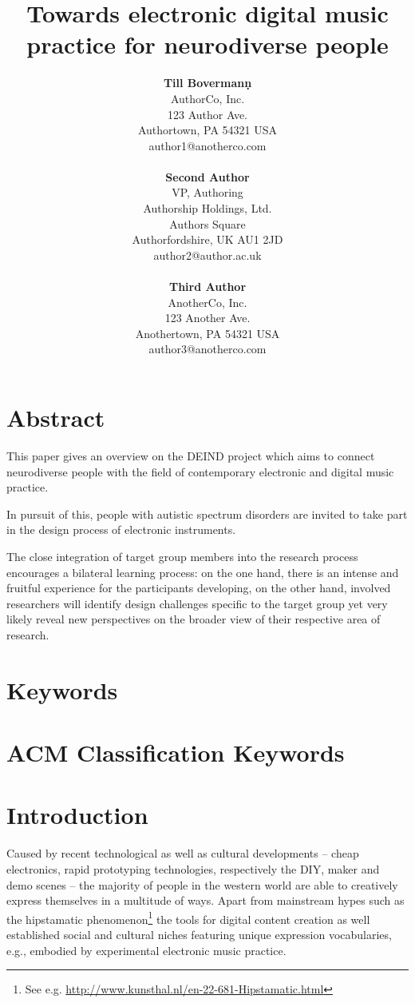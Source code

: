 \documentclass{chi-ext}
\title{Towards electronic digital music practice for neurodiverse people}
\author{
  \textbf{Till Bovermanṇ} \\
  AuthorCo, Inc. \\
  123 Author Ave. \\
  Authortown, PA 54321 USA \\
  author1@anotherco.com \\
  \\
  \textbf{Second Author} \\
  VP, Authoring \\
  Authorship Holdings, Ltd. \\
  Authors Square \\
  Authorfordshire, UK AU1 2JD \\
  author2@author.ac.uk \\
  \\
  \textbf{Third Author} \\
  AnotherCo, Inc. \\
  123 Another Ave. \\
  Anothertown, PA 54321 USA \\
  author3@anotherco.com \\
}
\begin{document}
\maketitle

\begin{multicols}{2}
  
\makeauthors
\makecopyright

\section{Abstract}
This paper gives an overview on the DEIND project which aims to connect neurodiverse people with the field of contemporary electronic and digital music practice. 

In pursuit of this, people with autistic spectrum disorders are invited to take part in the design process of electronic instruments.

The close integration of target group members into the research process encourages a bilateral learning process: on the one hand, there is an intense and fruitful experience for the participants developing, on the other hand, involved researchers will identify design challenges specific to the target group yet very likely reveal new perspectives on the broader view of their respective area of research.

\section{Keywords}
\makeatletter \@keywords \makeatother

\section{ACM Classification Keywords}
\makeatletter \@acmclassification \makeatother


\section{Introduction}

Caused by recent technological as well as cultural developments -- cheap electronics, rapid prototyping technologies, respectively the DIY, maker and demo scenes -- the majority of people in the western world are able to creatively express themselves in a multitude of ways. 
Apart from mainstream hypes such as the hipstamatic phenomenon\footnote{See e.g. \url{http://www.kunsthal.nl/en-22-681-Hipstamatic.html}} the tools for digital content creation as well established social and cultural niches featuring unique expression vocabularies, e.g., embodied by experimental electronic music practice.


\end{multicols}
\end{document}
